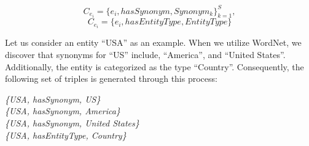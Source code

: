 \documentclass[letterpaper]{article} %
\begin{document}
 \begin{equation}\label{synonym}
C_{e_i}=\{e_i, hasSynonym, Synonym_k\}_{k=1}^S, 
\end{equation}
\begin{equation}\label{type}
C_{e_i}=\{ e_i, hasEntityType,{EntityType}\} 
\end{equation}






Let us consider an entity \enquote{USA} as an example. When we utilize WordNet, we discover that synonyms for \enquote{US} include, \enquote{America}, and \enquote{United States}. Additionally, the entity is categorized as the type \enquote{Country}. Consequently, the following set of triples is generated through this process: 
\begin{tcolorbox}
\centering
\small
\vspace{-0.1cm}
\textit{\{{USA, hasSynonym, US}\} }\\
\textit{\{{USA, hasSynonym, America}\} }\\
\textit{\{{USA, hasSynonym, United States}\}} \\
 \textit{\{{USA, hasEntityType, Country}\}} \\
  \vspace{-0.1cm}  
\end{tcolorbox}
\end{document}
